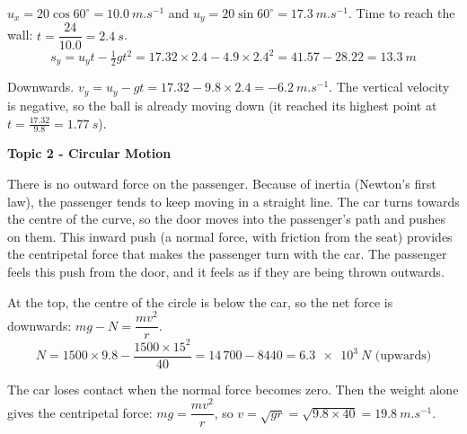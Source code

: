 \documentclass[12pt]{article}
\newcommand\anstopic[1]{\par\Needspace{8\baselineskip}\vspace{4mm}%
  \begin{center}{\headfont\bfseries\fontsize{14}{18}\selectfont #1\par}\end{center}\vspace{2pt}}
\begin{document}
\ansq
{}
\begin{crit}
\end{crit}
\sample
$u_x = 20\cos 60^\circ = \qty{10.0}{m.s^{-1}}$ and $u_y = 20\sin 60^\circ = \qty{17.3}{m.s^{-1}}$.
Time to reach the wall: $t = \dfrac{24}{10.0} = \qty{2.4}{s}$.
\[ s_y = u_y t - \tfrac{1}{2}gt^2 = 17.32 \times 2.4 - 4.9 \times 2.4^2 = 41.57 - 28.22 = \qty{13.3}{m} \]
\begin{crit}
\end{crit}
\sample
Downwards. $v_y = u_y - gt = 17.32 - 9.8 \times 2.4 = \qty{-6.2}{m.s^{-1}}$. The vertical velocity is
negative, so the ball is already moving down (it reached its highest point at $t = \frac{17.32}{9.8} =
\qty{1.77}{s}$).

\anstopic{Topic 2 - Circular Motion}

\ansq
\begin{crit}
\end{crit}
\sample
There is no outward force on the passenger. Because of inertia (Newton's first law), the passenger
tends to keep moving in a straight line. The car turns towards the centre of the curve, so the door
moves into the passenger's path and pushes on them. This inward push (a normal force, with friction
from the seat) provides the centripetal force that makes the passenger turn with the car. The
passenger feels this push from the door, and it feels as if they are being thrown outwards.

\ansq
{}
\begin{crit}
\end{crit}
\sample
At the top, the centre of the circle is below the car, so the net force is downwards:
$mg - N = \dfrac{mv^2}{r}$.
\[ N = 1500 \times 9.8 - \frac{1500 \times 15^2}{40} = 14\,700 - 8440 = \qty{6.3e3}{N} \text{ (upwards)} \]
\begin{crit}
\end{crit}
\sample
The car loses contact when the normal force becomes zero. Then the weight alone gives the
centripetal force: $mg = \dfrac{mv^2}{r}$, so $v = \sqrt{gr} = \sqrt{9.8 \times 40} = \qty{19.8}{m.s^{-1}}$.
\end{document}
